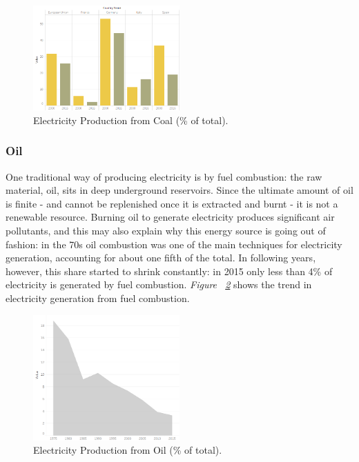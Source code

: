 \documentclass[a4paper,12pt]{book}
\begin{document}
\begin{figure}[tb]
\begin{center}
\captionsetup{justification=centering}
\includegraphics[width=0.5\textwidth]{Images/coal.png}
\caption{Electricity Production from Coal (\% of total). }
\label{fig:coal}
\end{center}
\end{figure}

\subsubsection*{Oil}

One traditional way of producing electricity is by fuel combustion: the raw material, oil, sits in deep underground reservoirs. Since the ultimate amount of oil is finite - and cannot be replenished once it is extracted and burnt - it is not a renewable resource. Burning oil to generate electricity produces significant air pollutants, and this may also explain why this energy source is going out of fashion: in the 70s oil combustion was one of the main techniques for electricity generation, accounting for about one fifth of the total. In following years, however, this share started to shrink constantly: in 2015 only less than 4\% of electricity is generated by fuel combustion. \textit{Figure ~\ref{fig:oil}} shows the trend in electricity generation from fuel combustion.

\begin{figure}[tb]
\begin{center}
\captionsetup{justification=centering}
\includegraphics[width=0.5\textwidth]{Images/oil.png}
\caption{Electricity Production from Oil (\% of total).}
\label{fig:oil}
\end{center}
\end{figure}
\end{document}
